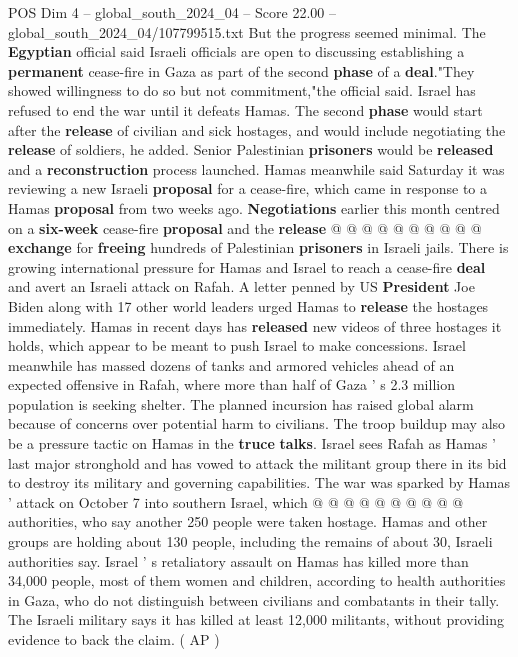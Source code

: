 \begin{textsample}{POS Dim 4 – global\_south\_2024\_04 – Score 22.00 – global\_south\_2024\_04/107799515.txt}
But the progress seemed minimal.
The \textbf{Egyptian} official said Israeli officials are open to discussing establishing a \textbf{permanent} cease-fire in Gaza as part of the second \textbf{phase} of a \textbf{deal}."They showed willingness to do so but not commitment,"the official said.
Israel has refused to end the war until it defeats Hamas.
The second \textbf{phase} would start after the \textbf{release} of civilian and sick hostages, and would include negotiating the \textbf{release} of soldiers, he added.
Senior Palestinian \textbf{prisoners} would be \textbf{released} and a \textbf{reconstruction} process launched.
Hamas meanwhile said Saturday it was reviewing a new Israeli \textbf{proposal} for a cease-fire, which came in response to a Hamas \textbf{proposal} from two weeks ago. \textbf{Negotiations} earlier this month centred on a \textbf{six-week} cease-fire \textbf{proposal} and the \textbf{release} @ @ @ @ @ @ @ @ @ @ \textbf{exchange} for \textbf{freeing} hundreds of Palestinian \textbf{prisoners} in Israeli jails.
There is growing international pressure for Hamas and Israel to reach a cease-fire \textbf{deal} and avert an Israeli attack on Rafah.
A letter penned by US \textbf{President} Joe Biden along with 17 other world leaders urged Hamas to \textbf{release} the hostages immediately.
Hamas in recent days has \textbf{released} new videos of three hostages it holds, which appear to be meant to push Israel to make concessions.
Israel meanwhile has massed dozens of tanks and armored vehicles ahead of an expected offensive in Rafah, where more than half of Gaza ' s 2.3 million population is seeking shelter.
The planned incursion has raised global alarm because of concerns over potential harm to civilians.
The troop buildup may also be a pressure tactic on Hamas in the \textbf{truce} \textbf{talks}.
Israel sees Rafah as Hamas ' last major stronghold and has vowed to attack the militant group there in its bid to destroy its military and governing capabilities.
The war was sparked by Hamas ' attack on October 7 into southern Israel, which @ @ @ @ @ @ @ @ @ @ authorities, who say another 250 people were taken hostage.
Hamas and other groups are holding about 130 people, including the remains of about 30, Israeli authorities say.
Israel ' s retaliatory assault on Hamas has killed more than 34,000 people, most of them women and children, according to health authorities in Gaza, who do not distinguish between civilians and combatants in their tally.
The Israeli military says it has killed at least 12,000 militants, without providing evidence to back the claim. ( AP )

\end{textsample}
